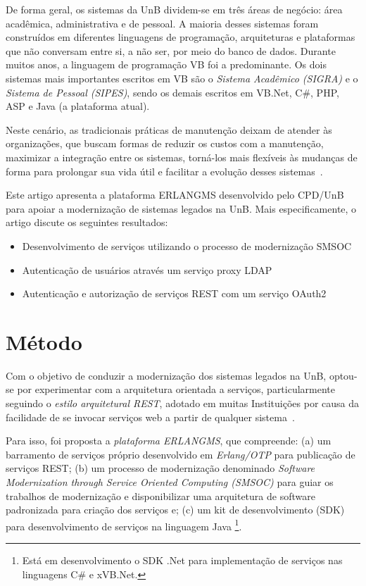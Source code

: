\documentclass[12pt]{article}
\begin{document}
De forma geral, os sistemas da UnB dividem-se em
três áreas de negócio: área acadêmica, administrativa e de pessoal.
A maioria desses sistemas foram construídos em diferentes linguagens de programação,
arquiteturas e plataformas que não conversam entre
si, a não ser, por meio do banco de dados. Durante muitos anos,
a linguagem de programação VB foi a predominante. Os dois sistemas mais
importantes escritos em VB são o \emph{Sistema Acadêmico (SIGRA)} e
o \emph{Sistema de Pessoal (SIPES)}, sendo os demais escritos
em VB.Net, C\#, PHP, ASP e Java (a plataforma atual). 

Neste cenário, as tradicionais práticas de manutenção deixam 
de atender \`{a}s organizações, que buscam formas de reduzir 
os custos com a manutenção, maximizar a integração entre os sistemas,
torná-los mais flexíveis às mudanças de forma para prolongar sua vida útil e facilitar a evolução
desses sistemas~\cite{S3_Bisbal:1999}. 


Este artigo apresenta a plataforma ERLANGMS desenvolvido pelo CPD/UnB 
para apoiar a modernização de sistemas legados na UnB. Mais
especificamente, o artigo discute os seguintes resultados:

\begin{itemize}

\item Desenvolvimento de serviços utilizando o processo de modernização SMSOC

\item Autenticação de usuários através um serviço proxy LDAP

\item Autenticação e autorização de serviços REST com um serviço OAuth2

\end{itemize} 


\section{Método}


Com o objetivo de conduzir a modernização dos sistemas legados na UnB,
optou-se por experimentar com a arquitetura orientada a servi\c cos, particularmente 
seguindo o \emph{estilo arquitetural REST}, adotado 
em muitas Instituições por causa
da facilidade de se invocar serviços 
web a partir de qualquer sistema~\cite{fielding2000architectural}. 

Para isso, foi proposta a \emph{plataforma ERLANGMS}, 
que compreende: (a) um barramento de serviços próprio 
desenvolvido em \emph{Erlang/OTP} para publicação de serviços REST;
(b) um processo de modernização
denominado \emph{Software Modernization through Service Oriented Computing (SMSOC)} 
para guiar os trabalhos de modernização e disponibilizar uma arquitetura de 
software padronizada para criação dos serviços e;
(c) um kit de desenvolvimento (SDK) para desenvolvimento de serviços na linguagem Java
\footnote{Está em desenvolvimento o SDK .Net para implementação de serviços nas linguagens C\# e xVB.Net.}.
\end{document}
